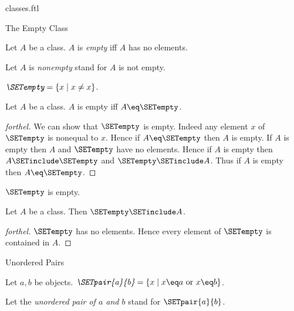 \documentclass{naproche-library}
\begin{document}
\begin{smodule}[title=Classes]{classes.ftl}
\begin{sfragment}{The Empty Class}
  \begin{definition}[forthel,id=FOUNDATIONS_01_6252477624090624]
    Let $A$ be a class.
    $A$ is \emph{empty} iff $A$ has no elements.

    Let $A$ is \emph{nonempty} stand for $A$ is not empty.
  \end{definition}

  \begin{definition}[forthel,id=FOUNDATIONS_01_7939928493129728]
    $\emph{\SETempty} = \{ x \mid x \neq x \}$.
  \end{definition}

  \begin{proposition}[forthel,id=FOUNDATIONS_01_2263153161273344]
    Let $A$ be a class.
    $A$ is empty iff $A \eq \SETempty$.
  \end{proposition}
  \begin{proof}[forthel]
    We can show that $\SETempty$ is empty.
    Indeed any element $x$ of $\SETempty$ is nonequal to $x$.
    Hence if $A \eq \SETempty$ then $A$ is empty.
    If $A$ is empty then $A$ and $\SETempty$ have no elements.
    Hence if $A$ is empty then $A \SETinclude \SETempty$ and $\SETempty \SETinclude A$.
    Thus if $A$ is empty then $A \eq \SETempty$.
  \end{proof}

  \begin{corollary}[forthel,id=FOUNDATIONS_01_1495141426659328]
    $\SETempty$ is empty.
  \end{corollary}

  \begin{corollary}[forthel,id=FOUNDATIONS_01_6931785090859008]
    Let $A$ be a class.
    Then $\SETempty \SETinclude A$.
  \end{corollary}
  \begin{proof}[forthel]
    $\SETempty$ has no elements.
    Hence every element of $\SETempty$ is contained in $A$.
  \end{proof}
\end{sfragment}

\begin{sfragment}{Unordered Pairs}
  \begin{definition}[forthel,id=FOUNDATIONS_01_3471035364016128]
    Let $a, b$ be objects.
    $\emph{\SETpair{a}{b}} = \{ x \mid x \eq a\text{ or }x \eq b \}$.

    Let the \emph{unordered pair of $a$ and $b$} stand for $\SETpair{a}{b}$.
  \end{definition}


\end{sfragment}
\end{smodule}
\end{document}
